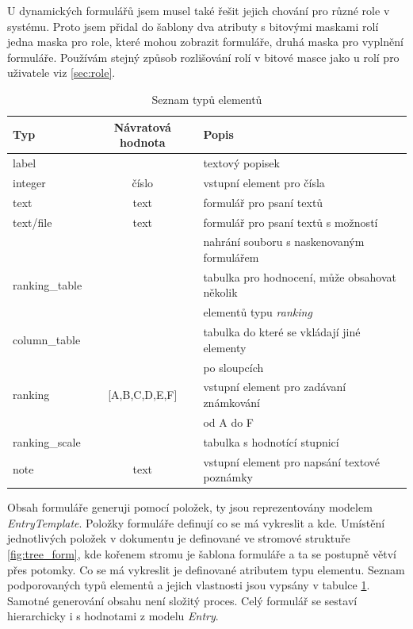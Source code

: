 U dynamických formulářů jsem musel také řešit jejich chování pro různé role v systému. Proto jsem přidal do šablony dva atributy s bitovými maskami rolí jedna maska pro role, které mohou zobrazit formuláře, druhá maska pro vyplnění formuláře. Používám stejný způsob rozlišování rolí v bitové masce jako u rolí pro uživatele viz \ref{sec:role}.

\begin{table}[h]
\begin{center}
\begin{tabular}{|l|c|l|}

\hline
\textbf{Typ} & \textbf{Návratová hodnota} & \textbf{Popis} \\ \hline
label &  & textový popisek \\\hline
integer & číslo & vstupní element pro čísla \\ \hline
text & text & formulář pro psaní textů \\\hline
text/file & text & formulář pro psaní textů s možností \\ & &  nahrání souboru s naskenovaným formulářem \\\hline
ranking\_table &  & tabulka pro hodnocení, může obsahovat několik \\ & & elementů typu \textit{ranking} \\\hline
column\_table & & tabulka do které se vkládají jiné elementy \\ & &  po sloupcích \\\hline
ranking & [A,B,C,D,E,F] & vstupní element pro zadávaní známkování  \\ & &   od A do F \\\hline
ranking\_scale & & tabulka s hodnotící stupnicí \\\hline
note & text & vstupní element pro napsání textové poznámky \\\hline

\end{tabular}
\caption{Seznam typů elementů}
\label{tab:elements}
\end{center}
\end{table}

Obsah formuláře generuji pomocí položek, ty jsou reprezentovány modelem \textit{EntryTemplate}. Položky formuláře definují co se má vykreslit a kde. Umístění jednotlivých položek v dokumentu je definované ve stromové struktuře \ref{fig:tree_form}, kde kořenem stromu je šablona formuláře a ta se postupně větví přes potomky. Co se má vykreslit je definované atributem typu elementu. Seznam podporovaných typů elementů a jejich vlastnosti jsou vypsány v tabulce \ref{tab:elements}. Samotné generování obsahu není složitý proces. Celý formulář se sestaví hierarchicky i s hodnotami z modelu \textit{Entry}.

